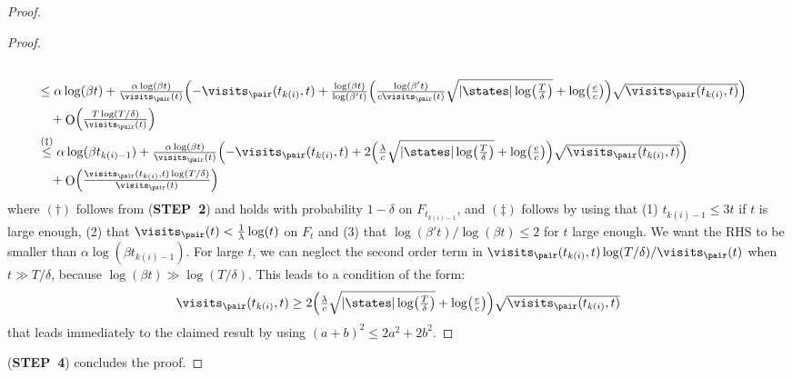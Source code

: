 \documentclass[preprint,cleveref,12pt]{colt2025}
\DeclarePairedDelimiter{\parens}{(}{)}	%
\DeclarePairedDelimiter{\abs}{\lvert}{\rvert}	%
\newcommand{\tsqrt}[1]{{\textstyle\sqrt{#1}}} %
\DeclareMathOperator*{\OH}{\mathrm{O}}
\def\STEP#1{(\strong{STEP~#1})}
\newcommand{\strong}[1]{\textbf{#1}}
\begin{document}
\begin{proof}
\begin{proof}
\begin{align*}
{                }
                \\
                & \le 
                \alpha \log(\beta t)
                +
                \tfrac{\alpha \log(\beta t)}{\visits_\pair(t)} \parens*{
                    - \visits_\pair(t_{k(i)}, t)
                    + \tfrac{\log(\beta t)}{\log(\beta' t)}
                    \parens*{
                        \tfrac{\log(\beta' t)}{c \visits_\pair(t)}
                        \tsqrt{\abs{\states} \log\parens*{\tfrac T\delta}}
                        + \log\parens*{\tfrac ec}
                    }
                    \tsqrt{\visits_\pair(t_{k(i)}, t)}
                }
                \\
                & \quad
                + \OH \parens*{
                    \tfrac{T \log(T/\delta)}{\visits_\pair (t)}
                }
                \\
                & \overset{(\ddagger)}\le
                \alpha \log(\beta t_{k(i)-1})
                +
                \tfrac{\alpha \log(\beta t)}{\visits_\pair(t)} \parens*{
                    - \visits_\pair(t_{k(i)}, t)
                    + 2 \parens*{
                        \tfrac \lambda c
                        \tsqrt{\abs{\states} \log\parens*{\tfrac T\delta}}
                        + \log\parens*{\tfrac ec}
                    }
                    \tsqrt{\visits_\pair(t_{k(i)}, t)}
                }
                \\
                & \quad
                + \OH \parens*{
                    \tfrac{\visits_\pair(t_{k(i)}, t) \log(T/\delta)}{\visits_\pair (t)}
                }
            \end{align*}
            where $(\dagger)$ follows from \STEP{2} and holds with probability $1 - \delta$ on $F_{t_{k(i)-1}}$, 
            and $(\ddagger)$ follows by using that (1) $t_{k(i)-1} \le 3 t$ if $t$ is large enough, (2) that $\visits_\pair (t) < \frac 1\lambda \log(t)$ on $F_t$ and (3) that $\log(\beta't) / \log(\beta t) \le 2$ for $t$ large enough. 
            We want the RHS to be smaller than $\alpha \log(\beta t_{k(i)-1})$.
            For large $t$, we can neglect the second order term in $\visits_\pair(t_{k(i)}, t) \log(T/\delta)/\visits_\pair(t)$ when $t \gg T/\delta$, because $\log(\beta t) \gg \log(T/\delta)$.
            This leads to a condition of the form:
            \begin{equation*}
                \visits_\pair(t_{k(i)}, t)
                \ge
                2 \parens*{
                    \tfrac \lambda c
                    \tsqrt{\abs{\states} \log\parens*{\tfrac T\delta}}
                    + \log\parens*{\tfrac ec}
                }
                \tsqrt{\visits_\pair(t_{k(i)}, t)}
            \end{equation*}
            that leads immediately to the claimed result by using $(a + b)^2 \le 2 a^2 + 2 b^2$. 
        \end{proof}
        \STEP{4} concludes the proof. 
    \end{proof}
\end{document}
